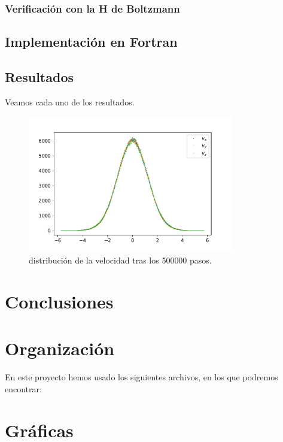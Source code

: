 \documentclass[11pt]{article} %
\begin{document}
\subsubsection{Verificación con la H de Boltzmann}

\subsection{Implementación en Fortran}

\subsection{Resultados}

Veamos cada uno de los resultados. 


\begin{figure}[h!] \centering
	\includegraphics[width=0.8\textwidth]{../../Graficas/Velocidades_histo.pdf}
	\caption{distribución de la velocidad tras los 500000 pasos.}
	\label{Fig:07}
\end{figure}	


\section{Conclusiones}

\section{Organización}

En este proyecto hemos usado los siguientes archivos, en los que podremos encontrar:


\section{Gráficas}
\end{document}
